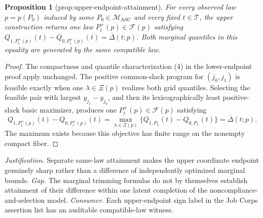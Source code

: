 \documentclass{article}
\newtheorem{proposition}{Proposition}
\begin{document}
\begin{proposition}[prop:upper-endpoint-attainment]\label{prop:upper-endpoint-attainment}
For every observed law \(p=p(P_0)\) induced by some \(P_0\in\mathcal M_{\mathrm{ASC}}\) and every fixed \(t\in\mathcal T\), the upper construction returns one law \(P_t^+(p)\in\mathcal F(p)\) satisfying \(Q_{1,P_t^+(p)}(t)-Q_{0,P_t^+(p)}(t)=\overline\Delta(t;p)\). Both marginal quantiles in this equality are generated by the same compatible law.
\end{proposition}
\begin{proof}
The compactness and quantile characterization (4) in the lower-endpoint proof apply unchanged. The positive common-slack program for \((j_0,j_1)\) is feasible exactly when one \(\lambda\in\Xi(p)\) realizes both grid quantiles. Selecting the feasible pair with largest \(y_{j_1}-y_{j_0}\), and then its lexicographically least positive-slack basic maximizer, produces one \(P_t^+(p)\in\mathcal F(p)\) satisfying
\[
 Q_{1,P_t^+(p)}(t)-Q_{0,P_t^+(p)}(t)
 =\max_{\lambda\in\Xi(p)}
 \{Q_{1,P_\lambda}(t)-Q_{0,P_\lambda}(t)\}
 =\overline\Delta(t;p).
\]
The maximum exists because this objective has finite range on the nonempty compact fiber.
\end{proof}
\par\smallskip\noindent \textit{Justification.} Separate same-law attainment makes the upper coordinate endpoint genuinely sharp rather than a difference of independently optimized marginal bounds. \textit{Gap.} The marginal trimming formulas do not by themselves establish attainment of their difference within one latent completion of the noncompliance-and-selection model. \textit{Consumer.} Each upper-endpoint sign label in the Job Corps assertion list has an auditable compatible-law witness.
\end{document}
